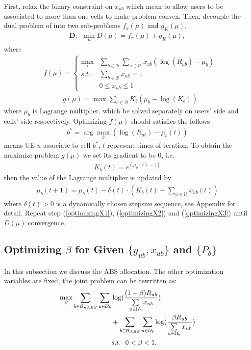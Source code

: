 \documentclass[journal]{IEEETran}
\begin{document}
First, relax the binary constraint on ${x_{ub}}$ which mean to allow users to be associated to more than one cells to make problem convex. Then, decouple the dual problem of into two sub-problems $f_x(\mu)$ and $g_K(\mu)$,
\begin{align}\label{dualProblem}
  \bm{D}:~~\min_\mu D(\mu) = f_x(\mu) + g_K(\mu),
\end{align}
where
\begin{align} \label{optimizing x UE}
  &f(\mu) = \left\{
  \begin{matrix}
  \max\limits_{\bm{x}} &\sum\limits_{b \in \mathcal{B}} \sum\limits_{u \in \mathcal{U}} x_{ub}(\log(\overline{R}_{ub}) - \mu_b) \\
  s.t. &\sum\limits_{b \in \mathcal{B}} x_{ub} = 1 \\
   &0 \leq x_{ub} \leq 1
  \end{matrix}
  \right.
\end{align}
\begin{align}\label{optimizing x BS}
  &g(\mu) = \max \sum\limits_{b \in \mathcal{B}} K_b(\mu_b - \log(K_b))
\end{align}
where $\mu_b$ is Lagrange multiplier. which be solved separately on users' side and cells' side respectively. Optimizing $f(\mu)$ should satisfies the follows
\begin{align}\label{optimizingX1}
  b^* = \arg \max_b (\log(R_{ub}) - \mu_b(t))
\end{align}
means UE-$u$ associate to cell-$b^*$, $t$ represent times of teration. To obtain the maximize problem $g(\mu)$ we set its gradient to be 0, i.e.
\begin{align}\label{optimizingX2}
 K_b(t) = e^{(\mu_b(t) - 1)}
\end{align}
then the value of the Lagrange multiplier is updated by
\begin{align}\label{optimizingX3}
\mu_b(t+1) = \mu_b(t) - \delta(t)\cdot(K_b(t) - \sum\limits_{u \in \mathcal{U}} x_{ub}(t))
\end{align}
where $\delta(t) > 0$ is a dynamically chosen stepsize sequence, see Appendix for detail. Repeat step (\ref{optimizingX1}), (\ref{optimizingX2}) and (\ref{optimizingX3}) until $D(\mu)$ convergence.

\subsection{Optimizing $\beta$ for Given $\{ y_{ub}, x_{ub} \}$ and $\{ P_b \}$}\label{optimizing beta}
In this subsection we discuss the ABS allocation. The other optimization variables are fixed, the joint problem can be rewritten as:
\begin{align}
  \max_{\beta} \sum_{b \in \mathcal{B}_{nABS}} \sum_{u \in \mathcal{U}_b} & \log(\frac{ (1 - \beta)R_{ub} }{ \sum\limits_{u \in \mathcal{U}_b} x_{ub}}) \notag\\
  &+ \sum_{b \in \mathcal{B}_{ABS}} \sum_{u \in \mathcal{U}_b} \log(\frac{ \beta R_{ub} }{ \sum\limits_{u \in \mathcal{U}_b} x_{ub}}) \\
  &s.t.~~0 < \beta < 1. \notag
\end{align}
\end{document}
